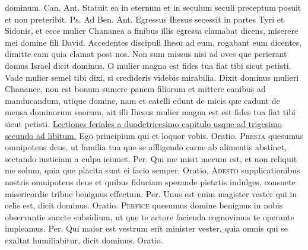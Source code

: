 \begin{multicols*}{2}
dominum. {\color{Red} Can.}  {\color{Red} Ant.} Statuit ea in eternum et in seculum seculi preceptum posuit et non preteribit. {\color{Red} Ps.}  {\color{Red} Ad Ben. Ant.} Egressus Ihesus secessit in partes Tyri et Sidonis, et ecce mulier Chananea a finibus illis egressa clamabat dicens, miserere mei domine fili David.
 Accedentes discipuli Ihesu ad eum, rogabant eum dicentes, dimitte eam quia clamat post nos.
 Non sum missus nisi ad oves que perierant domus Israel dicit dominus.
 O mulier magna est fides tua fiat tibi sicut petisti.
 Vade mulier semel tibi dixi, si credideris videbis mirabilia.
 Dixit dominus mulieri Chananee, non est bonum sumere panem filiorum et mittere canibus ad manducandum, utique domine, nam et catelli edunt de micis que cadunt de mensa dominorum suorum, ait illi Ihesus mulier magna est est fides tua fiat tibi sicut petisti.
\newline \ul{Lectiones feriales a duodetricesimo capitulo usque ad trigesimo secundo ad libitum.}
 Ego principium qui et loquor vobis. {\color{Red} Oratio.}
\lettrine[lines=2]{\zallmancaps \color{Red} P}{resta} quesumus omnipotens deus, ut familia tua que se affligendo carne ab alimentis abstinet, sectando iusticiam a culpa ieiunet. Per.
 Qui me misit mecum est, et non reliquit me solum, quia que placita sunt ei facio semper. {\color{Red} Oratio.}
\lettrine[lines=2]{\zallmancaps \color{Blue} A}{desto} supplicationibus nostris omnipotens deus et quibus fiduciam sperande pietatis indulges, consuete misericordie tribue benignus effectum. Per.
 Unus est enim magister vester qui in celis est, dicit dominus. {\color{Red} Oratio.}
\lettrine[lines=2]{\zallmancaps \color{Red} P}{erfice} quesumus domine benignus in nobis observantie sancte subsidium, ut que te actore facienda cognovimus te operante impleamus. Per.
 Qui maior est vestrum erit minister vester, quia omnis qui se exaltat humiliabitur, dicit dominus. {\color{Red} Oratio.}

\end{multicols*}
